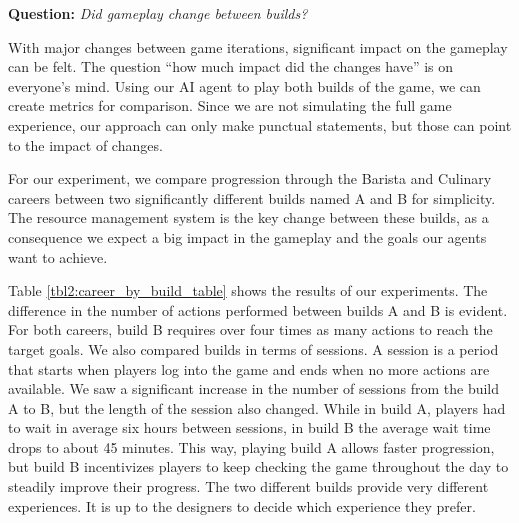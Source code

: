 \documentclass[letterpaper]{article} %
\begin{document}
\textbf{Question:} {\em Did gameplay change between builds?}

With major changes between game iterations, significant impact on the gameplay can be felt. The question ``how much impact did the changes have'' is on everyone's mind. Using our AI agent to play both builds of the game, we can create metrics for comparison. Since we are not simulating the full game experience, our approach can only make punctual statements, but those can point to the impact of changes.

For our experiment, we compare progression through the Barista and Culinary careers between two significantly different builds named A and B for simplicity. The resource management system is the key change between these builds, as a consequence we expect a big impact in the gameplay and the goals our agents want to achieve.


Table \ref{tbl2:career_by_build_table} shows the results of our experiments. The difference in the number of actions performed between builds A and B is evident. For both careers, build B requires over four times as many actions to reach the target goals. We also compared builds in terms of sessions. A session is a period that starts when players log into the game and ends when no more actions are available. We saw a significant increase in the number of sessions from the build A to B, but the length of the session also changed. While in build A, players had to wait in average six hours between sessions, in build B the average wait time drops to about 45 minutes. This way, playing build A allows faster progression, but build B incentivizes players to keep checking the game throughout the day to steadily improve their progress. The two different builds provide very different experiences. It is up to the designers to decide which experience they prefer.
\end{document}
